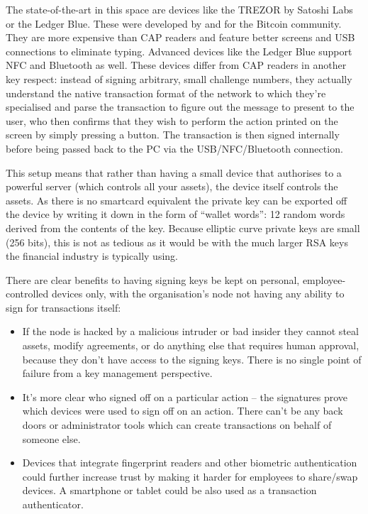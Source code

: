 \documentclass{article}
\begin{document}
The state-of-the-art in this space are devices like the TREZOR\cite{TREZOR} by Satoshi Labs or the Ledger Blue. These
were developed by and for the Bitcoin community. They are more expensive than CAP readers and feature better
screens and USB connections to eliminate typing. Advanced devices like the Ledger Blue support NFC and
Bluetooth as well. These devices differ from CAP readers in another key respect: instead of signing arbitrary, small
challenge numbers, they actually understand the native transaction format of the network to which they're specialised and parse the
transaction to figure out the message to present to the user, who then confirms that they wish to perform the action
printed on the screen by simply pressing a button. The transaction is then signed internally before being passed back to
the PC via the USB/NFC/Bluetooth connection.

This setup means that rather than having a small device that authorises to a powerful server (which controls all your
assets), the device itself controls the assets. As there is no smartcard equivalent the private key can be exported off
the device by writing it down in the form of ``wallet words'': 12 random words derived from the contents of the key.
Because elliptic curve private keys are small (256 bits), this is not as tedious as it would be with the much larger RSA
keys the financial industry is typically using.

There are clear benefits to having signing keys be kept on personal, employee-controlled devices only, with the organisation's
node not having any ability to sign for transactions itself:

\begin{itemize}
\item If the node is hacked by a malicious intruder or bad insider they cannot steal assets, modify agreements,
or do anything else that requires human approval, because they don't have access to the signing keys. There is no single
point of failure from a key management perspective.
\item It's more clear who signed off on a particular action -- the signatures prove which devices were used to sign off
on an action. There can't be any back doors or administrator tools which can create transactions on behalf of someone else.
\item Devices that integrate fingerprint readers and other biometric authentication could further increase trust by
making it harder for employees to share/swap devices. A smartphone or tablet could be also used as a transaction authenticator.
\end{itemize}
\end{document}
